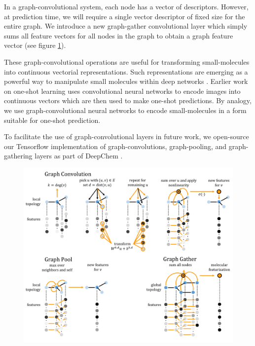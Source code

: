\documentclass[journal=jacsat,manuscript=article]{achemso}
\begin{document}
In a graph-convolutional system, each node has a vector of descriptors. However, at prediction time, we will require a single vector descriptor of fixed size for the entire graph. We introduce a new graph-gather convolutional layer which simply sums all feature vectors for all nodes in the graph to obtain a graph feature vector (see figure \ref{conv}).

These graph-convolutional operations are useful for transforming small-molecules into continuous vectorial representations. Such representations are emerging as a powerful way to manipulate small molecules within deep networks \cite{gomez2016automatic}. Earlier work on one-shot learning uses convolutional neural networks to encode images into continuous vectors which are then used to make one-shot predictions. By analogy, we use graph-convolutional neural networks to encode small-molecules in a form suitable for one-shot prediction.

To facilitate the use of graph-convolutional layers in future work, we open-source our Tensorflow\cite{abadi2016tensorflow} implementation of graph-convolutions, graph-pooling, and graph-gathering layers as part of DeepChem \cite{ram2016}.

\begin{figure}[h]
\includegraphics[width=\textwidth]{graphconv_graphic.png}
\label{conv}
\end{figure}
\end{document}

